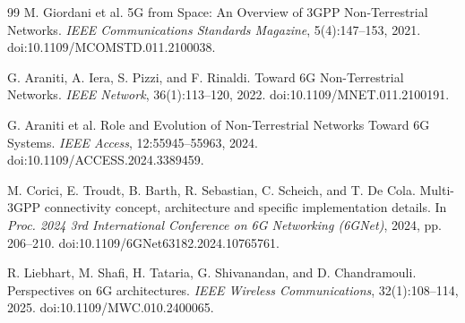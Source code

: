 \documentclass[sigconf,review]{acmart}
\begin{document}
\begin{thebibliography}{99}
M. Giordani et al. 5G from Space: An Overview of 3GPP Non-Terrestrial Networks. \emph{IEEE Communications Standards Magazine}, 5(4):147--153, 2021. doi:10.1109/MCOMSTD.011.2100038.

G. Araniti, A. Iera, S. Pizzi, and F. Rinaldi. Toward 6G Non-Terrestrial Networks. \emph{IEEE Network}, 36(1):113--120, 2022. doi:10.1109/MNET.011.2100191.

G. Araniti et al. Role and Evolution of Non-Terrestrial Networks Toward 6G Systems. \emph{IEEE Access}, 12:55945--55963, 2024. doi:10.1109/ACCESS.2024.3389459.

M. Corici, E. Troudt, B. Barth, R. Sebastian, C. Scheich, and T. De Cola. Multi-3GPP connectivity concept, architecture and specific implementation details. In \emph{Proc. 2024 3rd International Conference on 6G Networking (6GNet)}, 2024, pp. 206--210. doi:10.1109/6GNet63182.2024.10765761.

R. Liebhart, M. Shafi, H. Tataria, G. Shivanandan, and D. Chandramouli. Perspectives on 6G architectures. \emph{IEEE Wireless Communications}, 32(1):108--114, 2025. doi:10.1109/MWC.010.2400065.

\end{thebibliography}
\end{document}
